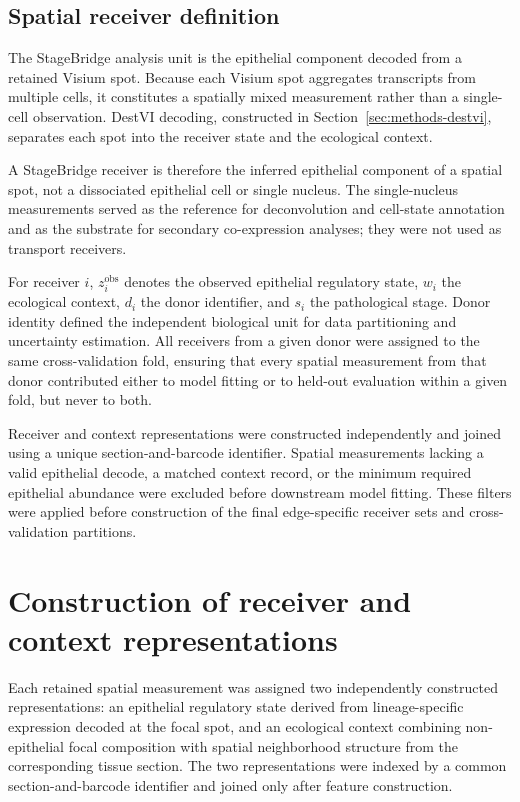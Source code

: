 \subsection{Spatial receiver definition}
\label{sec:methods-analysis-unit}

The StageBridge analysis unit is the epithelial component decoded from a retained Visium spot. Because each Visium spot aggregates transcripts from multiple cells, it constitutes a spatially mixed measurement rather than a single-cell observation. DestVI decoding, constructed in Section~\ref{sec:methods-destvi}, separates each spot into the receiver state and the ecological context.

A StageBridge receiver is therefore the inferred epithelial component of a spatial spot, not a dissociated epithelial cell or single nucleus. The single-nucleus measurements served as the reference for deconvolution and cell-state annotation and as the substrate for secondary co-expression analyses; they were not used as transport receivers.

For receiver \(i\), \(z_i^{\mathrm{obs}}\) denotes the observed epithelial
regulatory state, \(w_i\) the ecological context, \(d_i\) the donor identifier, and \(s_i\) the pathological stage. Donor identity defined the independent
biological unit for data partitioning and uncertainty estimation. All receivers
from a given donor were assigned to the same cross-validation fold, ensuring that every spatial measurement from that donor contributed either to model
fitting or to held-out evaluation within a given fold, but never to both.

Receiver and context representations were constructed independently and joined using a unique section-and-barcode identifier. Spatial measurements lacking a valid epithelial decode, a matched context record, or the minimum required epithelial abundance were excluded before downstream model fitting. These
filters were applied before construction of the final edge-specific receiver sets and cross-validation partitions.



\section{Construction of receiver and context representations}
\label{sec:methods-representations}

Each retained spatial measurement was assigned two independently constructed representations: an epithelial regulatory state derived from lineage-specific expression decoded at the focal spot, and an ecological context combining non-epithelial focal composition with spatial neighborhood structure from the corresponding tissue section. The two representations were indexed by a common section-and-barcode identifier and joined only after feature construction.

